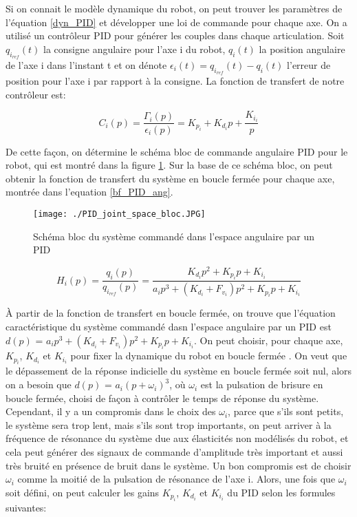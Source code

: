 Si on connait le modèle dynamique du robot, on peut trouver les paramètres de l'équation \ref{dyn_PID} et développer une loi de commande pour chaque axe. On a utilisé un contrôleur PID pour générer les couples dans chaque articulation. Soit $ q_{i_{ref}}(t) $ la consigne angulaire pour l'axe i du robot, $ q_i(t) $ la position angulaire de l'axe i dans l'instant t et on dénote $ \epsilon_i(t) = q_{i_{ref}}(t) - q_i(t) $ l'erreur de position pour l'axe i par rapport à la consigne. La fonction de transfert de notre contrôleur est:

	\begin{equation}
		 C_i(p) = \dfrac{\Gamma_i(p)}{\epsilon_i(p)} = K_{p_i} + K_{d_i}p + \dfrac{K_{i_i}}{p}
	\end{equation}

De cette façon, on détermine le schéma bloc de commande angulaire PID pour le robot, qui est montré dans la figure \ref{fig:PID_joint_space_diagram}. Sur la base de ce schéma bloc, on peut obtenir la fonction de transfert du système en boucle fermée pour chaque axe, montrée dans l'equation \ref{bf_PID_ang}.
	
\begin{figure}[H] \label{commande_PID_ang}
	\begin{center}	
		\captionsetup{justification=centering,margin=1cm}
		\texttt{[image: ./PID\_joint\_space\_bloc.JPG]}
		\caption{Schéma bloc du système commandé dans l'espace angulaire par un PID}
		\label{fig:PID_joint_space_diagram}
	\end{center}
\end{figure}
	
\begin{equation} 
	 H_i(p) = \dfrac{q_i(p)}{q_{i_{ref}}(p)} = \dfrac{K_{d_i}p^2 + K_{p_i}p + K_{i_i}}{a_ip^3 + (K_{d_i} + F_{v_i})p^2 + K_{p_i}p + K_{i_i}}
	 \label{bf_PID_ang}
\end{equation}

À partir de la fonction de transfert en boucle fermée, on trouve que l'équation caractéristique du système commandé dasn l'espace angulaire par un PID est $ d(p)$ = $a_ip^3 + (K_{d_i} + F_{v_i})p^2 + K_{p_i}p + K_{i_i} $. On peut choisir, pour chaque axe, $ K_{p_i} $, $ K_{d_i} $ et $ K_{i_i} $ pour fixer la dynamique du robot en boucle fermée \cite{ogata2010modern}. On veut que le dépassement de la réponse indicielle du système en boucle fermée soit nul, alors on a besoin que $ d(p)$ = $ a_i(p + \omega_i)^3 $, où $ \omega_i $ est la pulsation de brisure en boucle fermée, choisi de façon à contrôler le temps de réponse du système. Cependant, il y a un compromis dans le choix des $ \omega_i $, parce que s'ils sont petits, le système sera trop lent, mais s'ils sont trop importants, on peut arriver à la fréquence de résonance du système due aux élasticités non modélisés du robot, et cela peut générer des signaux de commande d'amplitude très important et aussi très bruité en présence de bruit dans le système. Un bon compromis est de choisir $ \omega_i $ comme la moitié de la pulsation de résonance de l'axe i. Alors, une fois que $ \omega_i $ soit défini, on peut calculer les gains $ K_{p_i} $, $ K_{d_i} $ et $ K_{i_i} $ du PID selon les formules suivantes: 

